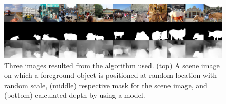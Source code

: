 \documentclass[review]{cvpr}
\begin{document}




\begin{figure}
  \begin{center}
    \includegraphics[width=1.0\linewidth]{good.png}
  \end{center}
  \caption{Three images resulted from the algorithm used. (top) A scene image on which a foreground object is positioned
   at random location with random scale, (middle) respective mask for the scene image, and (bottom) calculated depth by using a model.}
  \label{fig:finaldataset}
\end{figure}
\end{document}
